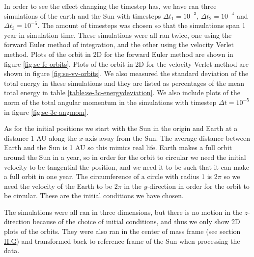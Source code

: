 \documentclass[reprint,english,notitlepage]{revtex4-1}  %
\begin{document}
In order to see the effect changing the timestep has, we have ran three simulations of the earth and the Sun with timesteps $\Delta t_1 = 10^{-3}$, $\Delta t_2 = 10^{-4}$ and $\Delta t_3 = 10^{-5}$. The amount of timesteps was chosen so that the simulations span 1 year in simulation time. These simulations were all ran twice, one using the forward Euler method of integration, and the other using the velocity Verlet method. Plots of the orbit in 2D for the forward Euler method are shown in figure \ref{fig:se-fe-orbits}. Plots of the orbit in 2D for the velocity Verlet method are shown in figure \ref{fig:se-vv-orbits}. We also measured the standard deviation of the total energy in these simulations and they are listed as percentages of the mean total energy in table \ref{table:se-3c-energydeviation}. We also include plots of the norm of the total angular momentum in the simulations with timestep $\Delta t = 10^{-5}$ in figure \ref{fig:se-3c-angmom}.

As for the initial positions we start with the Sun in the origin and Earth at a distance 1 AU along the $x$-axis away from the Sun. The average distance between Earth and the Sun is 1 AU so this mimics real life. Earth makes a full orbit around the Sun in a year, so in order for the orbit to circular we need the initial velocity to be tangential the position, and we need it to be such that it can make a full orbit in one year. The circumference of a circle with radius 1 is $2\pi$ so we need the velocity of the Earth to be $2\pi$ in the $y$-direction in order for the orbit to be circular. These are the initial conditions we have chosen.

The simulations were all ran in three dimensions, but there is no motion in the $z$-direction because of the choice of initial conditions, and thus we only show 2D plots of the orbits. They were also ran in the center of mass frame (see section \hyperref[sec:II:g]{II.G}) and transformed back to reference frame of the Sun when processing the data.
\end{document}
